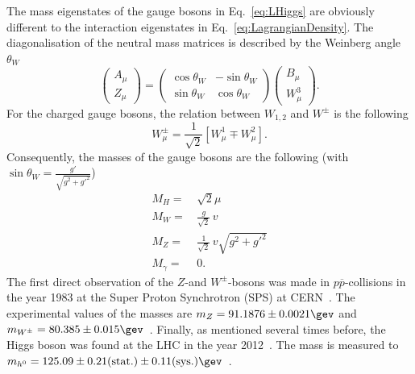 The mass eigenstates of the gauge bosons in Eq.~\eqref{eq:LHiggs} are obviously different to the interaction eigenstates in Eq.~\eqref{eq:LagrangianDensity}.
The diagonalisation of the neutral mass matrices is described by the Weinberg angle $\theta_W$
\begin{equation}
 \begin{pmatrix} A_{\mu} \\ Z_{\mu} \end{pmatrix} = 
   \begin{pmatrix} \cos \theta_W & - \sin \theta_W \\ \sin \theta_W  & \cos \theta_W \end{pmatrix} \begin{pmatrix} B_{\mu} \\ W^3_{\mu} \end{pmatrix}.
\end{equation}
For the charged gauge bosons, the relation between $W_{1,2}$ and $W^{\pm}$ is the following
\begin{equation}
 W_{\mu}^{\pm}= \frac{1}{\sqrt{2}} \left[ W_{\mu}^1 \mp W_{\mu}^2  \right].
\end{equation}
Consequently, the masses of the gauge bosons are the following (with $\sin{\theta_W} = \frac{g'}{\sqrt{g^2 + g'^2}}$)
\begin{equation}
 \begin{split}
  M_H =\,&  \sqrt{2} \mu\\
  M_W =\,& \frac{g}{\sqrt{2}}\, v\\
  M_Z =\,& \frac{1}{\sqrt{2}}\, v \sqrt{g^2 + g'^2}\\
  M_{\gamma} =\,& 0.
 \end{split}
\end{equation}
The first direct observation of the $Z$-and $W^{\pm}$-bosons was made in $p\overline{p}$-collisions in the year 1983 at the Super Proton Synchrotron (SPS) at CERN~\cite{bib:W_discovery,bib:Z_discovery}.
The experimental values of the masses are $m_{Z}=91.1876\pm0.0021\gev$ and $m_{W^{\pm}}=80.385\pm0.015\gev$~\cite{bib:PDG_2014}.
Finally, as mentioned several times before, the Higgs boson was found at the LHC in the year 2012~\cite{bib:Theory:CMS:HiggsObservation,bib:Theory:Atlas:HiggsObservation}.
The mass is measured to $m_{h^0}=125.09 \pm 0.21\text{(stat.)} \pm 0.11\text{(sys.)}\gev$~\cite{bib:HiggsMass}.

